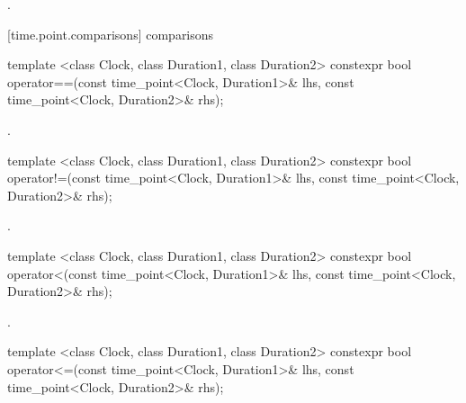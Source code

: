 \begin{itemdescr}
\pnum
\returns {}.
\end{itemdescr}

[time.point.comparisons]{ comparisons}

%
%
\begin{itemdecl}
template <class Clock, class Duration1, class Duration2>
  constexpr bool operator==(const time_point<Clock, Duration1>& lhs, const time_point<Clock, Duration2>& rhs);
\end{itemdecl}

\begin{itemdescr}
\pnum
\returns {}.
\end{itemdescr}

%
%
\begin{itemdecl}
template <class Clock, class Duration1, class Duration2>
  constexpr bool operator!=(const time_point<Clock, Duration1>& lhs, const time_point<Clock, Duration2>& rhs);
\end{itemdecl}

\begin{itemdescr}
\pnum
\returns {}.
\end{itemdescr}

%
%
\begin{itemdecl}
template <class Clock, class Duration1, class Duration2>
  constexpr bool operator<(const time_point<Clock, Duration1>& lhs, const time_point<Clock, Duration2>& rhs);
\end{itemdecl}

\begin{itemdescr}
\pnum
\returns {}.
\end{itemdescr}

%
%
\begin{itemdecl}
template <class Clock, class Duration1, class Duration2>
  constexpr bool operator<=(const time_point<Clock, Duration1>& lhs, const time_point<Clock, Duration2>& rhs);
\end{itemdecl}

